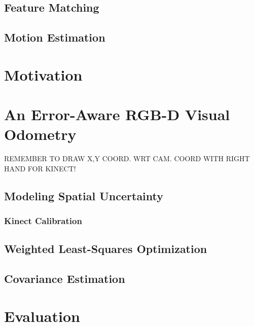 \documentclass[a4paper]{report}
\numberwithin{figure}{section}
\begin{document}
\section{Feature Matching} \label{sc_feature_matching}

\section{Motion Estimation} \label{sc_motion_estim}

\chapter{Motivation} \label{cp_motivation}

\chapter{An Error-Aware RGB-D Visual Odometry} \label{cp_covo}

REMEMBER TO DRAW X,Y COORD. WRT CAM. COORD WITH RIGHT HAND FOR KINECT!

\section{Modeling Spatial Uncertainty} \label{sc_spatial_uncertainty}

\subsection{Kinect Calibration} \label{sb_sc_kinect_calibration}

\section{Weighted Least-Squares Optimization} \label{sc_weighted_lsq}

\section{Covariance Estimation} \label{sc_covariance_estim}

\chapter{Evaluation} \label{cp_evaluation}
\end{document}
